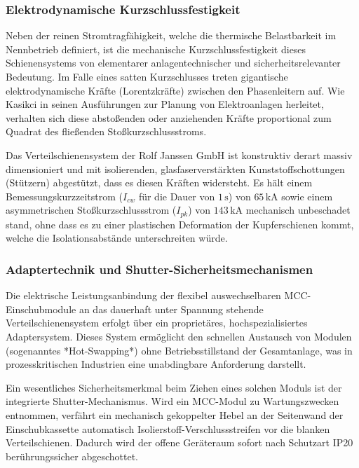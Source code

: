 \subsubsection{Elektrodynamische Kurzschlussfestigkeit}
Neben der reinen Stromtragfähigkeit, welche die thermische Belastbarkeit im Nennbetrieb definiert, ist die mechanische Kurzschlussfestigkeit dieses Schienensystems von elementarer anlagentechnischer und sicherheitsrelevanter Bedeutung. Im Falle eines satten Kurzschlusses treten gigantische elektrodynamische Kräfte (Lorentzkräfte) zwischen den Phasenleitern auf. Wie Kasikci \cite{Kasikci_Planung} in seinen Ausführungen zur Planung von Elektroanlagen herleitet, verhalten sich diese abstoßenden oder anziehenden Kräfte proportional zum Quadrat des fließenden Stoßkurzschlussstroms.

Das Verteilschienensystem der Rolf Janssen GmbH ist konstruktiv derart massiv dimensioniert und mit isolierenden, glasfaserverstärkten Kunststoffschottungen (Stützern) abgestützt, dass es diesen Kräften widersteht. Es hält einem Bemessungskurzzeitstrom ($I_{cw}$ für die Dauer von $1\,\text{s}$) von $65\,\text{kA}$ sowie einem asymmetrischen Stoßkurzschlussstrom ($I_{pk}$) von $143\,\text{kA}$ mechanisch unbeschadet stand, ohne dass es zu einer plastischen Deformation der Kupferschienen kommt, welche die Isolationsabstände unterschreiten würde.
\subsubsection{Adaptertechnik und Shutter-Sicherheitsmechanismen}
Die elektrische Leistungsanbindung der flexibel auswechselbaren MCC-Einschubmodule an das dauerhaft unter Spannung stehende Verteilschienensystem erfolgt über ein proprietäres, hochspezialisiertes Adaptersystem. Dieses System ermöglicht den schnellen Austausch von Modulen (sogenanntes *Hot-Swapping*) ohne Betriebsstillstand der Gesamtanlage, was in prozesskritischen Industrien eine unabdingbare Anforderung darstellt.

Ein wesentliches Sicherheitsmerkmal beim Ziehen eines solchen Moduls ist der integrierte Shutter-Mechanismus. Wird ein MCC-Modul zu Wartungszwecken entnommen, verfährt ein mechanisch gekoppelter Hebel an der Seitenwand der Einschubkassette automatisch Isolierstoff-Verschluss\-streifen vor die blanken Verteilschienen. Dadurch wird der offene Geräteraum sofort nach Schutzart IP20 berührungssicher abgeschottet.


